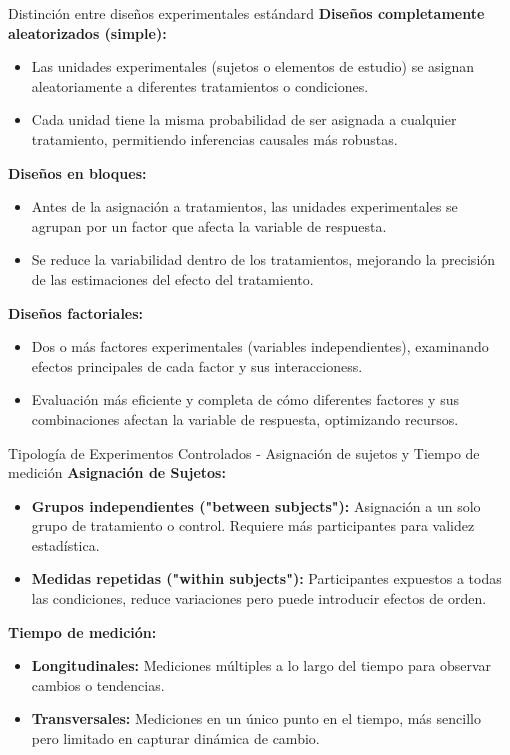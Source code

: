 ﻿\documentclass{beamer}
\begin{document}
\begin{frame}{Distinción entre diseños experimentales estándard}
    \textbf{Diseños completamente aleatorizados (simple):}
    \begin{itemize}
        \item Las unidades experimentales (sujetos o elementos de estudio) se asignan aleatoriamente a diferentes tratamientos o condiciones. 
        \item Cada unidad tiene la misma probabilidad de ser asignada a cualquier tratamiento, permitiendo inferencias causales más robustas.
    \end{itemize}

    \textbf{Diseños en bloques:}
    \begin{itemize}
        \item Antes de la asignación a tratamientos, las unidades experimentales se agrupan  por un factor que afecta la variable de respuesta.
        \item Se reduce la variabilidad dentro de los tratamientos, mejorando la precisión de las estimaciones del efecto del tratamiento.
    \end{itemize}

    \textbf{Diseños factoriales:}
    \begin{itemize}
        \item Dos o más factores experimentales (variables independientes), examinando efectos principales de cada factor y sus interaccioness.
        \item Evaluación más eficiente y completa de cómo diferentes factores y sus combinaciones afectan la variable de respuesta, optimizando recursos.
    \end{itemize}
\end{frame}

\begin{frame}{Tipología de Experimentos Controlados - Asignación de sujetos y Tiempo de medición}
    \textbf{Asignación de Sujetos:}
    \begin{itemize}
        \item \textbf{Grupos independientes ("between subjects"):} Asignación a un solo grupo de tratamiento o control. Requiere más participantes para validez estadística.
        \item \textbf{Medidas repetidas ("within subjects"):} Participantes expuestos a todas las condiciones, reduce variaciones pero puede introducir efectos de orden.
    \end{itemize}

    \textbf{Tiempo de medición:}
    \begin{itemize}
        \item \textbf{Longitudinales:} Mediciones múltiples a lo largo del tiempo para observar cambios o tendencias.
        \item \textbf{Transversales:} Mediciones en un único punto en el tiempo, más sencillo pero limitado en capturar dinámica de cambio.
    \end{itemize}
\end{frame}
\end{document}
